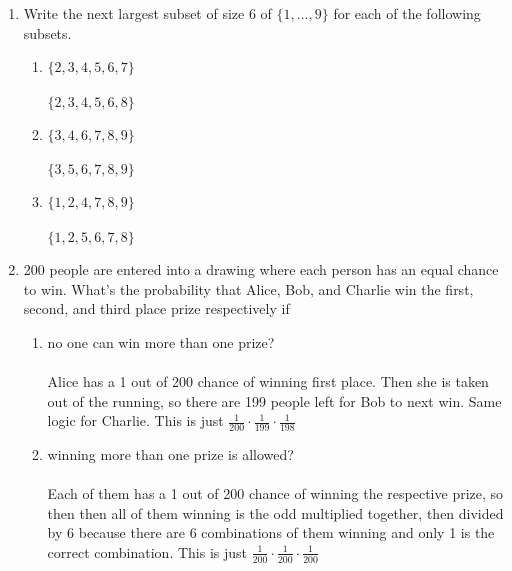 \documentclass[12pt]{letter}
\begin{document}
\begin{enumerate}
\item Write the next largest subset of size $6$ of $\{1, \ldots, 9\}$ for each of the following subsets.
\begin{enumerate}
	\item $\{2,3,4,5,6,7\}$\\\\
	$\{2,3,4,5,6,8\}$\\
	\item $\{3,4,6,7,8,9\}$\\\\
	$\{3,5,6,7,8,9\}$\\
	\item $\{1,2,4,7,8,9\}$\\\\
	$\{1,2,5,6,7,8\}$
\end{enumerate} 

\medskip

\item 200 people are entered into a drawing where each person has an equal chance to win. What's the probability that Alice, Bob, and Charlie win the first, second, and third place prize respectively if
\begin{enumerate}
\item no one can win more than one prize?\\\\
Alice has a 1 out of 200 chance of winning first place. Then she is taken out of the running, so there are 199 people left for Bob to next win. Same logic for Charlie. This is just $\frac{1}{200}\cdot \frac{1}{199}\cdot \frac{1}{198}$ 
\item winning more than one prize is allowed?\\\\
Each of them has a 1 out of 200 chance of winning the respective prize, so then then all of them winning is the odd multiplied together, then divided by 6 because there are 6 combinations of them winning and only 1 is the correct combination. This is just $\frac{1}{200}\cdot \frac{1}{200}\cdot \frac{1}{200}$ 
\end{enumerate}

\medskip


\end{enumerate}
\end{document}
